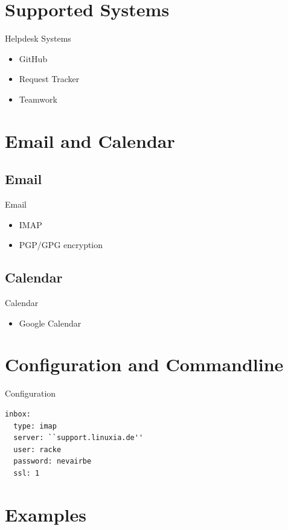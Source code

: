 \section{Supported Systems}

\begin{frame}{Helpdesk Systems}
\begin{itemize}
\item GitHub
\item Request Tracker
\item Teamwork
\end{itemize}
\end{frame}

\section{Email and Calendar}
\subsection{Email}
\begin{frame}{Email}
\begin{itemize}
\item IMAP
\item PGP/GPG encryption
\end{itemize}
\end{frame}

\subsection{Calendar}
\begin{frame}{Calendar}
\begin{itemize}
\item Google Calendar
\end{itemize}
\end{frame}

\section{Configuration and Commandline}
\begin{frame}[fragile]{Configuration}
\begin{lstlisting}
inbox:
  type: imap
  server: ``support.linuxia.de''
  user: racke
  password: nevairbe
  ssl: 1
\end{lstlisting}
\end{frame}

\section{Examples}

